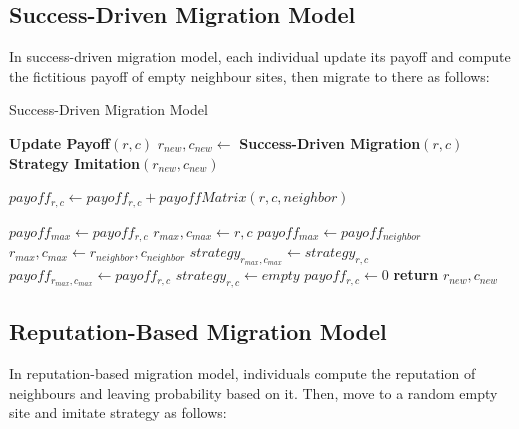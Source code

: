 \documentclass[11pt]{article}
\begin{document}
\subsection{Success-Driven Migration Model}
In success-driven migration model, each individual update its payoff and compute the fictitious payoff of empty neighbour sites, then migrate to there as follows:

\begin{algorithm}[!htbp]
  \caption{Success-Driven Migration Model}\label{successdriven}
	\begin{algorithmic}[1]
			
			\State \textbf{Update Payoff$(r,c)$}
			\State $r_{new},c_{new} \gets$ \textbf{Success-Driven Migration$(r,c)$}
			\State \textbf{Strategy Imitation$(r_{new},c_{new})$}
		\EndFor      
		\EndFor      
    \EndProcedure
	\end{algorithmic}
		
	\begin{algorithmic}[1]
      	\State $payoff_{r,c} \gets payoff_{r,c} + payoffMatrix(r,c, neighbor)$ 
      \EndFor      
    \EndProcedure
  \end{algorithmic}		
		
	\begin{algorithmic}[1]
      \State $payoff_{max} \gets payoff_{r,c}$
      \State $r_{max},c_{max} \gets r,c$
        \State $payoff_{max} \gets payoff_{neighbor}$
        \State $r_{max},c_{max} \gets r_{neighbor},c_{neighbor}$
        \EndIf
      \EndFor
      \State $strategy_{r_{max},c_{max}} \gets strategy_{r,c}$   
      \State $payoff_{r_{max},c_{max}} \gets payoff_{r,c}$
      \State $strategy_{r,c} \gets empty$   
      \State $payoff_{r,c} \gets 0$
      \State \textbf{return} $r_{new},c_{new}$	
    \EndProcedure
  \end{algorithmic}
\end{algorithm}


\subsection{Reputation-Based Migration Model}
In reputation-based migration model, individuals compute the reputation of neighbours and leaving probability based on it. Then, move to a random empty site and imitate strategy as follows:
\end{document}
